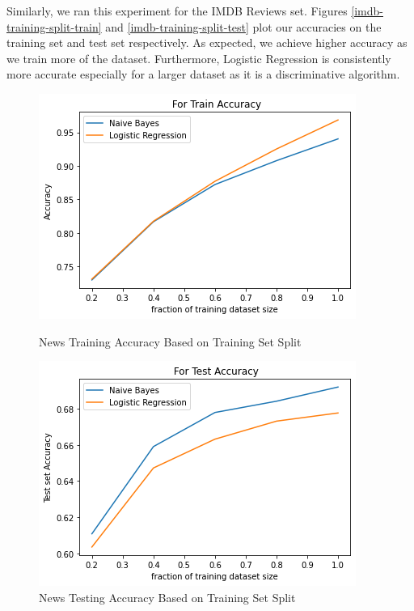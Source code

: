 \documentclass[11pt]{homework}
\begin{document}
Similarly, we ran this experiment for the IMDB Reviews set. Figures \ref{imdb-training-split-train} and \ref{imdb-training-split-test} plot our accuracies on the training set and test set respectively. As expected, we achieve higher accuracy as we train more of the dataset. Furthermore, Logistic Regression is consistently more accurate especially for a larger dataset as it is a discriminative algorithm. 

\begin{figure}[h!]
  \centering
  \begin{minipage}[h]{0.3\textwidth}
    \includegraphics[width=\textwidth]{news-varying-train-set-size-train-accuracy.png}
    \caption{News Training Accuracy Based on Training Set Split }\label{news-training-split-train}
  \end{minipage}
\hspace{1.5cm}
   \begin{minipage}[h]{0.3\textwidth}
    \includegraphics[width=\textwidth]{news-varying-train-set-size-test-accuracy.png}
    \caption{News Testing Accuracy Based on Training Set Split}\label{news-training-split-test}
  \end{minipage}
\end{figure}
\end{document}
